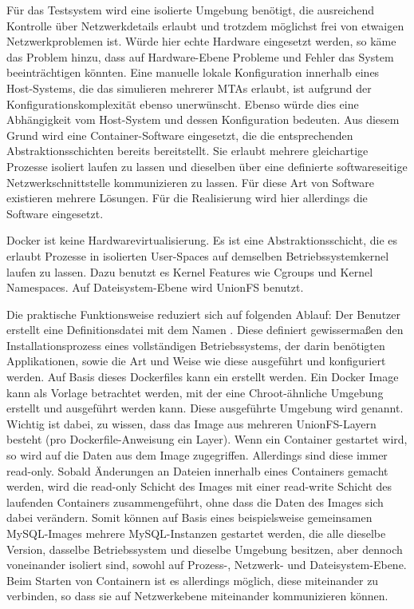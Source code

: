 Für das Testsystem wird eine isolierte Umgebung benötigt, die ausreichend Kontrolle über Netzwerkdetails erlaubt und trotzdem möglichst frei von etwaigen Netzwerkproblemen ist. Würde hier echte Hardware eingesetzt werden, so käme das Problem hinzu, dass auf Hardware-Ebene Probleme und Fehler das System beeinträchtigen könnten. Eine manuelle lokale Konfiguration innerhalb eines Host-Systems, die das simulieren mehrerer MTAs erlaubt, ist aufgrund der Konfigurationskomplexität ebenso unerwünscht. Ebenso würde dies eine Abhängigkeit vom Host-System und dessen Konfiguration bedeuten. Aus diesem Grund wird eine Container-Software eingesetzt, die die entsprechenden Abstraktionsschichten bereits bereitstellt. Sie erlaubt mehrere gleichartige Prozesse isoliert laufen zu lassen und dieselben über eine definierte softwareseitige Netzwerkschnittstelle kommunizieren zu lassen. Für diese Art von Software existieren mehrere Lösungen. Für die Realisierung wird hier allerdings die Software   eingesetzt.

Docker ist keine Hardwarevirtualisierung. Es ist eine Abstraktionsschicht, die es erlaubt Prozesse in isolierten User-Spaces auf demselben Betriebssystemkernel laufen zu lassen. Dazu benutzt es Kernel Features wie Cgroups und Kernel Namespaces. Auf Dateisystem-Ebene wird UnionFS benutzt.

Die praktische Funktionsweise reduziert sich auf folgenden Ablauf: Der Benutzer erstellt eine Definitionsdatei mit dem Namen . Diese definiert gewissermaßen den Installationsprozess eines vollständigen Betriebssystems, der darin benötigten Applikationen, sowie die Art und Weise wie diese ausgeführt und konfiguriert werden. Auf Basis dieses Dockerfiles kann ein  erstellt werden. Ein Docker Image kann als Vorlage betrachtet werden, mit der eine Chroot-ähnliche Umgebung erstellt und ausgeführt werden kann. Diese ausgeführte Umgebung wird  genannt. Wichtig ist dabei, zu wissen, dass das Image aus mehreren UnionFS-Layern besteht (pro Dockerfile-Anweisung ein Layer). Wenn ein Container gestartet wird, so wird auf die Daten aus dem Image zugegriffen. Allerdings sind diese immer read-only. Sobald Änderungen an Dateien innerhalb eines Containers gemacht werden, wird die read-only Schicht des Images mit einer read-write Schicht des laufenden Containers zusammengeführt, ohne dass die Daten des Images sich dabei verändern. Somit können auf Basis eines beispielsweise gemeinsamen MySQL-Images mehrere MySQL-Instanzen gestartet werden, die alle dieselbe Version, dasselbe Betriebssystem und dieselbe Umgebung besitzen, aber dennoch voneinander isoliert sind, sowohl auf Prozess-, Netzwerk- und Dateisystem-Ebene. Beim Starten von Containern ist es allerdings möglich, diese miteinander zu verbinden, so dass sie auf Netzwerkebene miteinander kommunizieren können.

